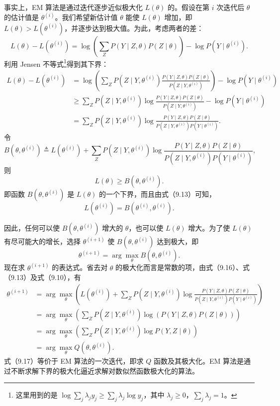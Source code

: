 \documentclass[UTF8, 12pt, fontset=fandol, oneside]{ctexart}
\begin{document}
事实上，EM 算法是通过迭代逐步近似极大化 $L(\theta)$ 的。假设在第 $i$ 次迭代后 $\theta$ 的估计值是 $\theta^{(i)}$。我们希望新估计值 $\theta$ 能使 $L(\theta)$ 增加，即 $L(\theta)>L(\theta^{(i)})$，并逐步达到极大值。为此，考虑两者的差：
\[
  L(\theta)-L(\theta^{(i)})
  =\log\left(\sum_Z P(Y\mid Z,\theta)P(Z\mid\theta)\right)-\log P(Y\mid\theta^{(i)}).
\]
利用 Jensen 不等式\footnote{这里用到的是 $\log\sum_j \lambda_j y_j\geq \sum_j\lambda_j\log y_j$，其中 $\lambda_j\geq0$，$\sum_j\lambda_j=1$。}得到其下界：
\[
\begin{aligned}
  L(\theta)-L(\theta^{(i)})
  &=\log\left(\sum_Z P(Z\mid Y,\theta^{(i)})
  \frac{P(Y\mid Z,\theta)P(Z\mid\theta)}{P(Z\mid Y,\theta^{(i)})}\right)
  -\log P(Y\mid\theta^{(i)}) \\
  &\geq \sum_Z P(Z\mid Y,\theta^{(i)})
  \log\frac{P(Y\mid Z,\theta)P(Z\mid\theta)}
  {P(Z\mid Y,\theta^{(i)})}
  -\log P(Y\mid\theta^{(i)}) \\
  &=\sum_Z P(Z\mid Y,\theta^{(i)})
  \log\frac{P(Y\mid Z,\theta)P(Z\mid\theta)}
  {P(Z\mid Y,\theta^{(i)})P(Y\mid\theta^{(i)})}.
\end{aligned}
\]
令
\begin{equation}
  B(\theta,\theta^{(i)})\triangleq L(\theta^{(i)})+
  \sum_Z P(Z\mid Y,\theta^{(i)})
  \log\frac{P(Y\mid Z,\theta)P(Z\mid\theta)}
  {P(Z\mid Y,\theta^{(i)})P(Y\mid\theta^{(i)})},
  \tag{9.13}
\end{equation}
则
\begin{equation}
  L(\theta)\geq B(\theta,\theta^{(i)}).
  \tag{9.14}
\end{equation}
即函数 $B(\theta,\theta^{(i)})$ 是 $L(\theta)$ 的一个下界，而且由式（9.13）可知，
\begin{equation}
  L(\theta^{(i)})=B(\theta^{(i)},\theta^{(i)}).
  \tag{9.15}
\end{equation}

因此，任何可以使 $B(\theta,\theta^{(i)})$ 增大的 $\theta$，也可以使 $L(\theta)$ 增大。为了使 $L(\theta)$ 有尽可能大的增长，选择 $\theta^{(i+1)}$ 使 $B(\theta,\theta^{(i)})$ 达到极大，即
\begin{equation}
  \theta^{(i+1)}=\arg\max_{\theta}B(\theta,\theta^{(i)}).
  \tag{9.16}
\end{equation}
现在求 $\theta^{(i+1)}$ 的表达式。省去对 $\theta$ 的极大化而言是常数的项，由式（9.16）、式（9.13）及式（9.10），有
\begin{equation}
\begin{aligned}
  \theta^{(i+1)}
  &=\arg\max_{\theta}\left(
  L(\theta^{(i)})+\sum_Z P(Z\mid Y,\theta^{(i)})
  \log\frac{P(Y\mid Z,\theta)P(Z\mid\theta)}
  {P(Z\mid Y,\theta^{(i)})P(Y\mid\theta^{(i)})}\right)\\
  &=\arg\max_{\theta}\left(
  \sum_Z P(Z\mid Y,\theta^{(i)})
  \log(P(Y\mid Z,\theta)P(Z\mid\theta))\right)\\
  &=\arg\max_{\theta}\left(
  \sum_Z P(Z\mid Y,\theta^{(i)})\log P(Y,Z\mid\theta)\right)\\
  &=\arg\max_{\theta}Q(\theta,\theta^{(i)}).
\end{aligned}
  \tag{9.17}
\end{equation}
式（9.17）等价于 EM 算法的一次迭代，即求 $Q$ 函数及其极大化。EM 算法是通过不断求解下界的极大化逼近求解对数似然函数极大化的算法。
\end{document}
